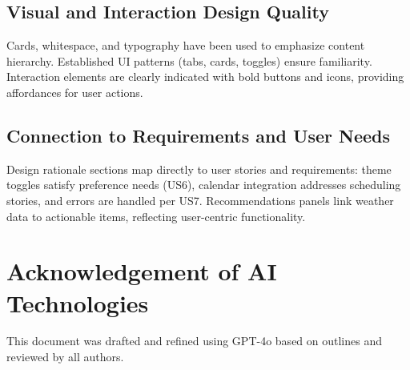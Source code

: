 \documentclass[fontsize=13pt,a4paper]{article}
\begin{document}
\subsection{Visual and Interaction Design Quality}
Cards, whitespace, and typography have been used to emphasize content hierarchy. Established UI patterns (tabs, cards, toggles) ensure familiarity. Interaction elements are clearly indicated with bold buttons and icons, providing affordances for user actions.

\subsection{Connection to Requirements and User Needs}
Design rationale sections map directly to user stories and requirements: theme toggles satisfy preference needs (US6), calendar integration addresses scheduling stories, and errors are handled per US7. Recommendations panels link weather data to actionable items, reflecting user-centric functionality.

\section*{Acknowledgement of AI Technologies}
This document was drafted and refined using GPT-4o based on outlines and reviewed by all authors.
\end{document}
